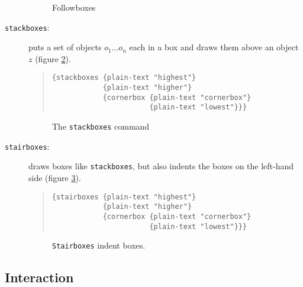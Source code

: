 \begin{description}
\begin{figure}[ht]
\begin{center}
\leavevmode
{}
\caption{Followboxes}
\label{follow-cb}
\end{center}
\end{figure}

\item[{\tt stackboxes}:] puts a set of objects $o_1 ... o_n$ each in a box
and draws them above an object $z$ (figure \ref{stack-cb}).

\begin{quote}
\begin{verbatim}
{stackboxes {plain-text "highest"} 
            {plain-text "higher"}
            {cornerbox {plain-text "cornerbox"} 
                       {plain-text "lowest"}}}
\end{verbatim}
\end{quote}

\begin{figure}[hb]
\begin{center}
\leavevmode
{}
\caption{The {\tt stackboxes} command}
\label{stack-cb}
\end{center}
\end{figure}

\item[{\tt stairboxes}:] draws boxes like {\tt stackboxes}, but also
indents the boxes on the left-hand side (figure \ref{stair-cb}).

\begin{quote}
\begin{verbatim}
{stairboxes {plain-text "highest"} 
            {plain-text "higher"}
            {cornerbox {plain-text "cornerbox"} 
                       {plain-text "lowest"}}}
\end{verbatim}
\end{quote}

\begin{figure}[hb]
\begin{center}
\leavevmode
{}
\caption{{\tt Stairboxes} indent boxes.}
\label{stair-cb}
\end{center}
\end{figure}

\end{description}

\subsection{Interaction}

